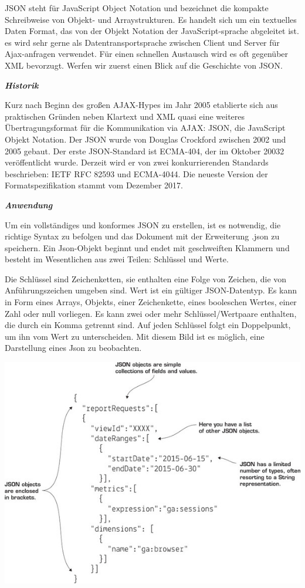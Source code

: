 JSON steht für JavaScript Object Notation und bezeichnet die kompakte Schreibweise von Objekt- und Arraystrukturen.\cite{philipp524} Es handelt sich um ein textuelles Daten Format, das von der Objekt Notation der JavaScript-sprache abgeleitet ist. es wird sehr gerne als Datentransportsprache zwischen Client und Server für Ajax-anfragen verwendet. Für einen schnellen Austausch wird es oft gegenüber XML bevorzugt. Werfen wir zuerst einen Blick auf die Geschichte von JSON. 

\textit{\textbf{Historik}}

Kurz nach Beginn des großen AJAX-Hypes im Jahr 2005 etablierte sich aus praktischen Gründen neben Klartext und XML quasi eine weiteres Übertragungsformat für die Kommunikation via AJAX: JSON, die JavaScript Objekt Notation.\cite{philipp658}
Der JSON wurde von Douglas Crockford zwischen 2002 und 2005 gebaut. Der erste JSON-Standard ist ECMA-404, der im Oktober 20032 veröffentlicht wurde. Derzeit wird er von zwei konkurrierenden Standards beschrieben: IETF RFC 82593 und ECMA-4044. Die neueste Version der Formatspezifikation stammt vom Dezember 2017. \cite{wikip01}

\textit{\textbf{Anwendung}}

Um ein vollständiges und konformes JSON zu erstellen, ist es notwendig, die richtige Syntax zu befolgen und das Dokument mit der Erweiterung .json zu speichern. Ein Json-Objekt beginnt und endet mit geschweiften Klammern {} und besteht im Wesentlichen aus zwei Teilen: Schlüssel und Werte. 

Die Schlüssel sind Zeichenketten, sie enthalten eine Folge von Zeichen, die von Anführungszeichen umgeben sind. Wert ist ein gültiger JSON-Datentyp. Es kann in Form eines Arrays, Objekts, einer Zeichenkette, eines booleschen Wertes, einer Zahl oder null vorliegen. Es kann zwei oder mehr Schlüssel/Wertpaare enthalten, die durch ein Komma getrennt sind. Auf jeden Schlüssel folgt ein Doppelpunkt, um ihn vom Wert zu unterscheiden. Mit diesem Bild ist es möglich, eine Darstellung eines Json zu beobachten. 

\begin{center}
\includegraphics[scale=1]{images/Darstellung_eines_JSON-Objekts}
\end{center}

